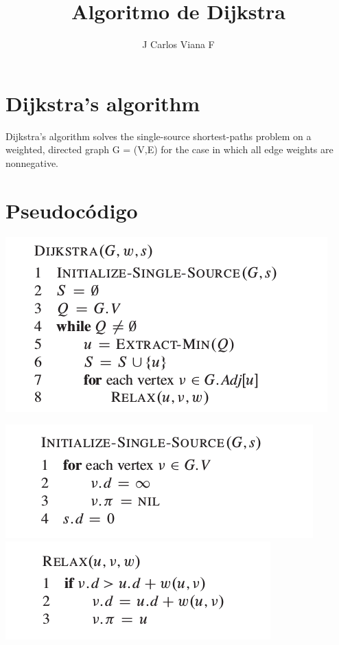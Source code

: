 \documentclass[aspectratio=169]{beamer}
\title{Algoritmo de Dijkstra}
\author{J Carlos Viana F}
\begin{document}
\frame{\titlepage}

\section{Dijkstra’s algorithm}

\begin{frame}
\cite[p. 658]{Cormen}
Dijkstra’s algorithm solves the single-source shortest-paths problem on a weighted,
directed graph G = (V,E) for the case in which all edge weights are nonnegative.
\end{frame}

\section{Pseudocódigo}

\begin{frame}
\includegraphics[scale=0.5]{cormen01.png}
\end{frame}

\begin{frame}
\includegraphics[scale=0.5]{cormen02.png}
\includegraphics[scale=0.5]{cormen03.png}
\end{frame}
\end{document}
